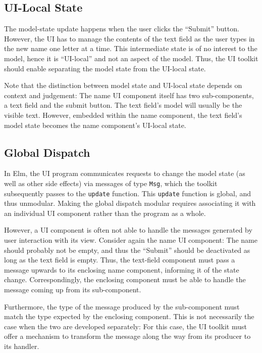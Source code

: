 \documentclass[sigplan,screen]{acmart}
\begin{document}
\subsection{UI-Local State}

The model-state update happens when the user clicks the ``Submit''
button.  However, the UI has to manage the contents of the text field
as the user types in the new name one letter at a time.  This
intermediate state is of no interest to the model, hence it is
``UI-local'' and not an aspect
of the model.  Thus, the UI toolkit should enable separating the model state
from the UI-local state.

Note that the distinction between model state and UI-local state
depends on context and judgement: The name UI component itself has two
sub-components, a text field and the submit button.  The text field's
model will usually be the visible text.  However, embedded within the
name component, the text field's model state becomes the name
component's UI-local state.

\subsection{Global Dispatch}

In Elm, the UI program communicates requests to change the model state
(as well as other side effects) via messages of type \texttt{Msg},
which the toolkit subsequently passes to the \texttt{update} function.
This \texttt{update} function is global, and thus unmodular.  Making
the global dispatch modular requires associating it with an individual
UI component rather than the program as a whole.

However, a UI component is often not able to handle the messages
generated by user interaction with its view.  Consider again the name UI
component: The name should probably not be empty, and thus the
``Submit'' should be deactivated as long as the text field is empty.
Thus, the text-field component must pass a message upwards to its
enclosing name component, informing it of the state change.
Correspondingly, the enclosing component must be able to handle the
message coming up from its sub-component.

Furthermore, the type of the message produced by the sub-component
must match the type expected by the enclosing component.  This is not
necessarily the case when the two are developed separately: For this
case, the UI toolkit must offer a mechanism to transform the message
along the way from its producer to its handler.
\end{document}
